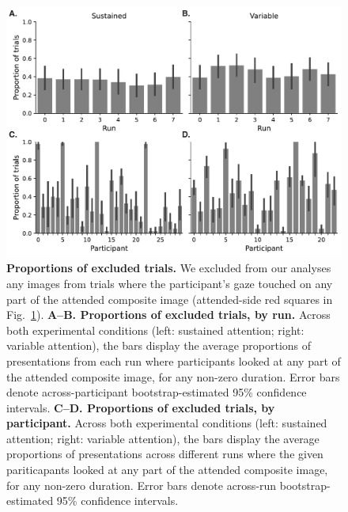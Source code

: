 \documentclass{article}
\begin{document}
  \begin{figure}[tp]
	\centering
	\includegraphics[width=1\textwidth]{figs/gaze_intersections}
  
\caption{\textbf{Proportions of excluded trials.} We excluded from our analyses
any images from trials where the participant's gaze touched on any part of the
attended composite image (attended-side red squares in
Fig.~\ref{fig:gaze-histograms}). \textbf{A--B. Proportions of excluded trials,
by run.} Across both experimental conditions (left: sustained attention; right:
variable attention), the bars display the average proportions of presentations
from each run where participants looked at any part of the attended composite
image, for any non-zero duration. Error bars denote across-participant
bootstrap-estimated 95\% confidence intervals. \textbf{C--D. Proportions of
excluded trials, by participant.} Across both experimental conditions (left:
sustained attention; right: variable attention), the bars display the average
proportions of presentations across different runs where the given
pariticapants looked at any part of the attended composite image, for any
non-zero duration. Error bars denote across-run bootstrap-estimated 95\%
confidence intervals.}

  \label{fig:gaze-histograms}
\end{figure}
\end{document}

